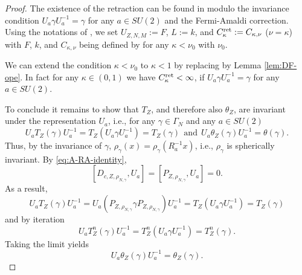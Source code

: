 \documentclass[a4paper]{amsart}
\begin{document}
\begin{proof}
  The existence of the retraction can be found in \cite[Pages
  593-594]{Fournaisetal2020} modulo the invariance condition
  $U_a \gamma U_a^{-1}=\gamma$ for any $a\in SU(2)$ and the
  Fermi-Amaldi correction. Using the notations of
  \cite{Fournaisetal2020}, we set $U_{Z,N,M}:=F$, $L:=k$, and
  $C_{\kappa}^{\rm ret}:=C_{\kappa,\nu}$ ($\nu=\kappa$) with $F$, $k$,
  and $C_{\kappa,\nu}$ being defined by \cite[pages 593-594 and
  Eq. (55)]{Fournaisetal2020} for any $\kappa<\nu_0$ with $\nu_0$.

  We can extend the condition $\kappa<\nu_0$ to $\kappa<1$ by
  replacing \cite[Theorem 4]{Fournaisetal2020} by Lemma
  \ref{lem:DF-ope}. In fact for any $\kappa\in (0,1)$ we have
  $C_{\kappa}^{\rm ret}<\infty$, if $U_a \gamma U_a^{-1}=\gamma$ for
  any $a\in SU(2)$.

  To conclude it remains to show that $T_Z$, and therefore also $\theta_Z$,
  are invariant under the representation $U_a$, i.e., for any
  $\gamma\in \Gamma_{N}$ and any $a\in SU(2)$
\begin{equation}
    U_aT_Z(\gamma) U_a^{-1}=T_Z( U_a \gamma  U_a^{-1})=T_Z(\gamma)\ \ \text{and}\ \
     U_a\theta_Z(\gamma) U_a^{-1}=\theta(\gamma).
\end{equation}
Thus, by the invariance of $\gamma$,
$\rho_{\gamma}(x)= \rho_{\gamma}(R_a^{-1}x)$, i.e.,
$\rho_{\gamma}$ is spherically invariant. By \eqref{eq:A-RA-identity},
\begin{equation}\label{eq:UA-commute}
    [D_{c,Z, \rho_{N,\gamma}},U_a]=[P_{Z, \rho_{N,\gamma}},U_a]=0.
\end{equation}
As a result,
\begin{equation}
     U_aT_Z(\gamma) U_a^{-1}= U_a (P_{Z, \rho_{N,\gamma}} \gamma P_{Z, \rho_{N,\gamma}}) U_a^{-1} =T_Z( U_a \gamma  U_a^{-1})=T_Z(\gamma)
\end{equation}
and by iteration
\begin{equation}
    U_aT_Z^n(\gamma) U_a^{-1}=T_Z^n( U_a \gamma  U_a^{-1})=T_Z^n(\gamma).
\end{equation}
Taking the limit yields
\begin{equation}
    U_a\theta_Z(\gamma) U_a^{-1}=\theta_Z(\gamma).
\end{equation}
\end{proof}
\end{document}
